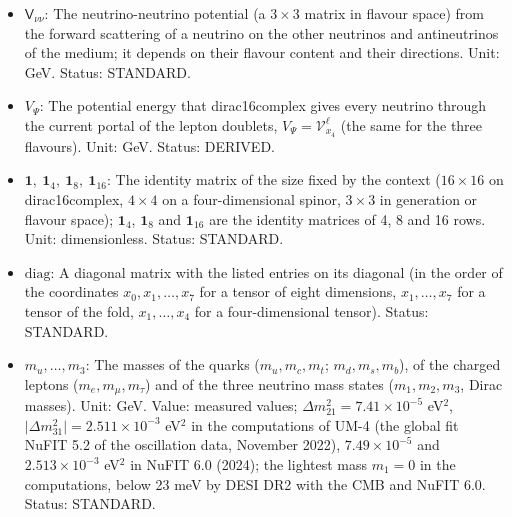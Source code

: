\documentclass[
  10pt,
]{article}
\begin{document}
\begin{itemize}
  \(\mathsf{V}_{\mathrm{m}}\): The matter potential of the neutrinos (a
  \(3 \times 3\) matrix in flavour space) from their forward scattering
  on the electrons, positrons and neutrons of the medium. Unit: GeV.
  Status: STANDARD.
\item
  \(\mathsf{V}_{\nu\nu}\): The neutrino-neutrino potential (a
  \(3 \times 3\) matrix in flavour space) from the forward scattering of
  a neutrino on the other neutrinos and antineutrinos of the medium; it
  depends on their flavour content and their directions. Unit: GeV.
  Status: STANDARD.
\item
  \(V_\Psi\): The potential energy that dirac16complex gives every
  neutrino through the current portal of the lepton doublets,
  \(V_\Psi = \mathcal{V}^{\ell}_{x_4}\) (the same for the three
  flavours). Unit: GeV. Status: DERIVED.
\item
  \(\mathbf{1},\ \mathbf{1}_4,\ \mathbf{1}_8,\ \mathbf{1}_{16}\): The
  identity matrix of the size fixed by the context (\(16 \times 16\) on
  dirac16complex, \(4 \times 4\) on a four-dimensional spinor,
  \(3 \times 3\) in generation or flavour space); \(\mathbf{1}_4\),
  \(\mathbf{1}_8\) and \(\mathbf{1}_{16}\) are the identity matrices of
  4, 8 and 16 rows. Unit: dimensionless. Status: STANDARD.
\item
  \(\mathrm{diag}\): A diagonal matrix with the listed entries on its
  diagonal (in the order of the coordinates \(x_0, x_1, \dots, x_7\) for
  a tensor of eight dimensions, \(x_1, \dots, x_7\) for a tensor of the
  fold, \(x_1, \dots, x_4\) for a four-dimensional tensor). Status:
  STANDARD.
\item
  \(m_u, \dots, m_3\): The masses of the quarks (\(m_u, m_c, m_t\);
  \(m_d, m_s, m_b\)), of the charged leptons (\(m_e, m_\mu, m_\tau\))
  and of the three neutrino mass states (\(m_1, m_2, m_3\), Dirac
  masses). Unit: GeV. Value: measured values;
  \(\Delta m_{21}^2 = 7.41\times10^{-5}\) eV\(^2\),
  \(\lvert\Delta m_{31}^2\rvert = 2.511\times10^{-3}\) eV\(^2\) in the
  computations of UM-4 (the global fit NuFIT 5.2 of the oscillation
  data, November 2022), \(7.49\times10^{-5}\) and \(2.513\times10^{-3}\)
  eV\(^2\) in NuFIT 6.0 (2024); the lightest mass \(m_1 = 0\) in the
  computations, below 23 meV by DESI DR2 with the CMB and NuFIT 6.0.
  Status: STANDARD.
\end{itemize}
\end{document}
